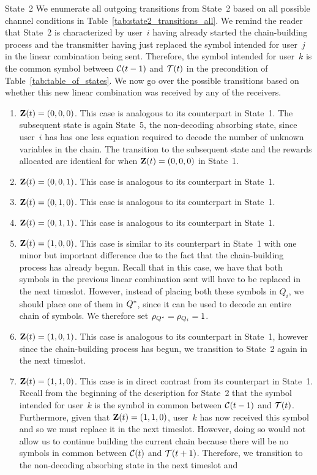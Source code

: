 

\begin{LaTeXdescription}
	\item [State~2]  We enumerate all outgoing transitions from State~2 based on all possible channel conditions in Table~\ref{tab:state2_transitions_all}.  We remind the reader that State~2 is characterized by user~$i$ having already started the chain-building process and the transmitter having just replaced the symbol intended for user~$j$ in the linear combination being sent.  Therefore, the symbol intended for user~$k$ is the common symbol between $\mathcal{C}(t-1)$ and $\mathcal{T}(t)$ in the precondition of Table~\ref{tab:table_of_states}.  
	We now go over the possible transitions based on whether this new linear combination was received by any of the receivers.
	\begin{enumerate}
		\item $\mathbf{Z}(t) = (0, 0, 0)$.  This case is analogous to its counterpart in State~1.  The subsequent state is again State~5, the non-decoding absorbing state, since user~$i$ has has one less equation required to decode the number of unknown variables in the chain.  The transition to the subsequent state and the rewards allocated are identical for when $\mathbf{Z}(t) = (0,0,0)$ in State~1.  
		\item $\mathbf{Z}(t) = (0, 0, 1)$. This case is analogous to its counterpart in State~1.  
		\item $\mathbf{Z}(t) = (0, 1, 0)$. This case is analogous to its counterpart in State~1.  
		\item $\mathbf{Z}(t) = (0, 1, 1)$. This case is analogous to its counterpart in State~1.  
		\item $\mathbf{Z}(t) = (1, 0, 0)$.  This case is similar to its counterpart in State~1 with one minor but important difference due to the fact that the chain-building process has already begun.  Recall that in this case, we have that both symbols in the previous linear combination sent will have to be replaced in the next timeslot.  However, instead of placing both these symbols in $Q_i$, we should place one of them in $Q^{*}$, since it can be used to decode an entire chain of symbols.  We therefore set $\rho_{Q^{*}} = \rho_{Q_{i}} = 1$.
		\item $\mathbf{Z}(t) = (1, 0, 1)$.  This case is analogous to its counterpart in State~1, however since the chain-building process has begun, we transition to State~2 again in the next timeslot.
		\item $\mathbf{Z}(t) = (1, 1, 0)$.  This case is in direct contrast from its counterpart in State~1.  Recall from the beginning of the description for State~2 that the symbol intended for user~$k$ is the symbol in common between $\mathcal{C}(t-1)$ and $\mathcal{T}(t)$.  Furthermore, given that $\mathbf{Z}(t) = (1, 1, 0)$, user~$k$ has now received this symbol and so we must replace it in the next timeslot.  However, doing so would not allow us to continue building the current chain because there will be no symbols in common between  $\mathcal{C}(t)$ and $\mathcal{T}(t+1)$.  Therefore, we transition to the non-decoding absorbing state in the next timeslot and  

\end{enumerate}
\end{LaTeXdescription}
